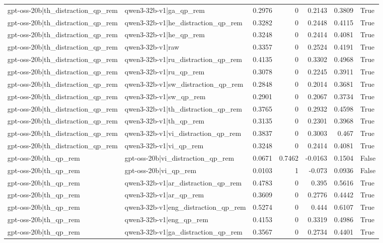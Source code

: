 \begin{table}
\begin{tabular}{l l r r r r l}
gpt-oss-20b|th_distraction_qp_rem & qwen3-32b-v1|ga_qp_rem & 0.2976 & 0 & 0.2143 & 0.3809 & True \\
gpt-oss-20b|th_distraction_qp_rem & qwen3-32b-v1|he_distraction_qp_rem & 0.3282 & 0 & 0.2448 & 0.4115 & True \\
gpt-oss-20b|th_distraction_qp_rem & qwen3-32b-v1|he_qp_rem & 0.3248 & 0 & 0.2414 & 0.4081 & True \\
gpt-oss-20b|th_distraction_qp_rem & qwen3-32b-v1|raw & 0.3357 & 0 & 0.2524 & 0.4191 & True \\
gpt-oss-20b|th_distraction_qp_rem & qwen3-32b-v1|ru_distraction_qp_rem & 0.4135 & 0 & 0.3302 & 0.4968 & True \\
gpt-oss-20b|th_distraction_qp_rem & qwen3-32b-v1|ru_qp_rem & 0.3078 & 0 & 0.2245 & 0.3911 & True \\
gpt-oss-20b|th_distraction_qp_rem & qwen3-32b-v1|sw_distraction_qp_rem & 0.2848 & 0 & 0.2014 & 0.3681 & True \\
gpt-oss-20b|th_distraction_qp_rem & qwen3-32b-v1|sw_qp_rem & 0.2901 & 0 & 0.2067 & 0.3734 & True \\
gpt-oss-20b|th_distraction_qp_rem & qwen3-32b-v1|th_distraction_qp_rem & 0.3765 & 0 & 0.2932 & 0.4598 & True \\
gpt-oss-20b|th_distraction_qp_rem & qwen3-32b-v1|th_qp_rem & 0.3135 & 0 & 0.2301 & 0.3968 & True \\
gpt-oss-20b|th_distraction_qp_rem & qwen3-32b-v1|vi_distraction_qp_rem & 0.3837 & 0 & 0.3003 & 0.467 & True \\
gpt-oss-20b|th_distraction_qp_rem & qwen3-32b-v1|vi_qp_rem & 0.3248 & 0 & 0.2414 & 0.4081 & True \\
gpt-oss-20b|th_qp_rem & gpt-oss-20b|vi_distraction_qp_rem & 0.0671 & 0.7462 & -0.0163 & 0.1504 & False \\
gpt-oss-20b|th_qp_rem & gpt-oss-20b|vi_qp_rem & 0.0103 & 1 & -0.073 & 0.0936 & False \\
gpt-oss-20b|th_qp_rem & qwen3-32b-v1|ar_distraction_qp_rem & 0.4783 & 0 & 0.395 & 0.5616 & True \\
gpt-oss-20b|th_qp_rem & qwen3-32b-v1|ar_qp_rem & 0.3609 & 0 & 0.2776 & 0.4442 & True \\
gpt-oss-20b|th_qp_rem & qwen3-32b-v1|eng_distraction_qp_rem & 0.5274 & 0 & 0.444 & 0.6107 & True \\
gpt-oss-20b|th_qp_rem & qwen3-32b-v1|eng_qp_rem & 0.4153 & 0 & 0.3319 & 0.4986 & True \\
gpt-oss-20b|th_qp_rem & qwen3-32b-v1|ga_distraction_qp_rem & 0.3567 & 0 & 0.2734 & 0.4401 & True \\

\end{tabular}
\end{table}
